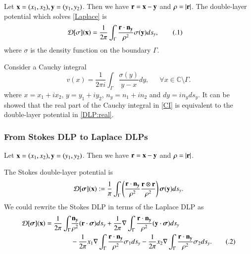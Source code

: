 \documentclass[preprint, 10pt]{elsarticle}
\newcommand{\Cdb}{\mbox{$\mathbb{C}$}}
\newcommand{\D}{\mbox{${\mathcal D}$}}
\newcommand\numberthis{\addtocounter{equation}{1}\tag{\theequation}}
\begin{document}
Let ${\bf x}=(x_1,x_2), {\bf y}=(y_1,y_2)$. Then we have ${\bf r}={\bf x} - {\bf y}$ and $\rho=|\bf r|$.
The double-layer potential which solves \eqref{Laplace} is 
\begin{align*}
\D[\sigma]({\bf x})&=\frac{1}{2\pi}\displaystyle\int_{\Gamma} \frac{{\bf r} \cdot {\bf n_y}}{\rho^2}\sigma({\bf y})ds_y,
\numberthis\label{DLP:real}
\end{align*}
where $\sigma$ is the density function on the boundary $\Gamma$.


Consider a Cauchy integral 
\begin{equation}\label{CI}
v({x})=\frac{1}{2\pi i}\int_{\Gamma}\frac{\sigma({ y})}{{ y}-{ x}} d{ y},\,\,\,\,\,\,\,\,\, \forall { x} \in \Cdb\setminus \Gamma.
\end{equation}
where ${ x}=x_1+ix_2$, $ { y}=y_1+iy_2$, ${ n_y}=n_1+i n_2$ and $d{ y}=i {n_y}ds_y$. It can be showed that 
the real part of the Cauchy integral in \eqref{CI} is equivalent to the double-layer potential in \eqref{DLP:real}. 


\subsubsection{From Stokes DLP to Laplace DLPs}

Let ${\bf x}=(x_1,x_2), {\bf y}=(y_1,y_2)$. Then we have ${\bf r}={\bf x} - {\bf y}$ and $\rho=|\bf r|$.


The Stokes double-layer potential  is
\begin{equation}\label{StokesDLP1}
\D[\boldsymbol\sigma]({\bf x}):=\frac{1}{\pi}\int_{\Gamma}\left(\frac{{\bf r} \cdot {\bf n_y}}{\rho^2}\frac{{\bf r} \otimes {\bf r}}{\rho^2}\right) {\boldsymbol\sigma({\bf y})} d s_y.
\end{equation}
We could rewrite the Stokes DLP in terms of the Laplace DLP as
\begin{align*}\label{StokesDLP2}
\D[\boldsymbol\sigma]({\bf x})=\frac{1}{2\pi}\int_{\Gamma}&\frac{{\bf n_y}}{\rho^2}({\bf r} \cdot {\boldsymbol \sigma})ds_y+\frac{1}{2\pi}\nabla\int_{\Gamma}\frac{{\bf r} \cdot {\bf n_y}}{\rho^2}({\bf y} \cdot{\boldsymbol \sigma})ds_y\\
&-\frac{1}{2\pi}x_1 \nabla\int_{\Gamma}\frac{{\bf r} \cdot {\bf n_y}}{\rho^2}\sigma_1ds_y-\frac{1}{2\pi}x_2\nabla\int_{\Gamma}\frac{{\bf r} \cdot {\bf n_y}}{\rho^2}\sigma_2ds_y. \numberthis
\end{align*}
\end{document}
